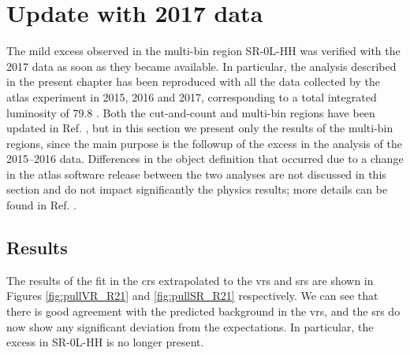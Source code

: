 \section{Update with 2017 data}
\label{sec:strong:r21}

The mild excess observed in the multi-bin region SR-0L-HH was verified with the 2017 data 
as soon as they became available. 
In particular, the analysis described in the present chapter has been reproduced with 
all the data collected by the \gls{atlas} experiment in 2015, 2016 and 2017, 
corresponding to a total integrated luminosity of 79.8 \ifb. 
Both the cut-and-count and multi-bin regions have been updated in Ref. \cite{ATLAS-CONF-2018-041}, 
but in this section we present only the results 
of the multi-bin regions, since the main purpose is the followup of the excess in the analysis of the 2015--2016 data.
Differences in the object definition that occurred due to a change in the \gls{atlas} software release between the 
two analyses are not discussed in this section and do not impact significantly the physics results; more details can be found 
in Ref. \cite{ATLAS-CONF-2018-041}.


\subsection{Results}

The results of the fit in the \glspl{cr} extrapolated to the \glspl{vr} and \glspl{sr} are shown in Figures 
\ref{fig:pullVR_R21} and \ref{fig:pullSR_R21} respectively. 
We can see that there is good agreement with the predicted background in the \glspl{vr}, and the \glspl{sr} do now show any 
significant deviation from the expectations. 
In particular, the excess in SR-0L-HH is no longer present. 


